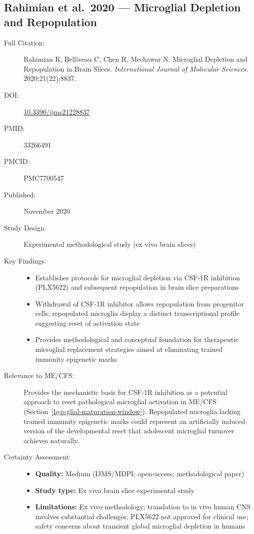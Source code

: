 \subsection{Rahimian et al.\ 2020 --- Microglial Depletion and Repopulation}

\begin{description}
    \item[Full Citation:] Rahimian R, Belliveau C, Chen R, Mechawar N. Microglial Depletion and Repopulation in Brain Slices. \textit{International Journal of Molecular Sciences}. 2020;21(22):8837.
    \item[DOI:] \href{https://doi.org/10.3390/ijms21228837}{10.3390/ijms21228837}
    \item[PMID:] 33266491
    \item[PMCID:] PMC7700547
    \item[Published:] November 2020
    \item[Study Design:] Experimental methodological study (ex vivo brain slices)
    \item[Key Findings:]
    \begin{itemize}
        \item Establishes protocols for microglial depletion via CSF-1R inhibition (PLX5622) and subsequent repopulation in brain slice preparations
        \item Withdrawal of CSF-1R inhibitor allows repopulation from progenitor cells; repopulated microglia display a distinct transcriptional profile suggesting reset of activation state
        \item Provides methodological and conceptual foundation for therapeutic microglial replacement strategies aimed at eliminating trained immunity epigenetic marks
    \end{itemize}
    \item[Relevance to ME/CFS:] Provides the mechanistic basis for CSF-1R inhibition as a potential approach to reset pathological microglial activation in ME/CFS (Section~\ref{hyp:glial-maturation-window}). Repopulated microglia lacking trained immunity epigenetic marks could represent an artificially induced version of the developmental reset that adolescent microglial turnover achieves naturally.
    \item[Certainty Assessment:]
    \begin{itemize}
        \item \textbf{Quality:} Medium (IJMS/MDPI; open-access; methodological paper)
        \item \textbf{Study type:} Ex vivo brain slice experimental study
        \item \textbf{Limitations:} Ex vivo methodology; translation to in vivo human CNS involves substantial challenges; PLX5622 not approved for clinical use; safety concerns about transient global microglial depletion in humans
    \end{itemize}
\end{description}

